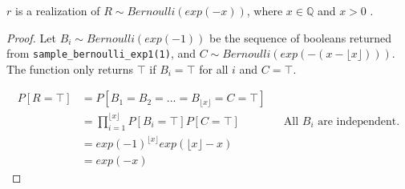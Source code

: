 \documentclass{article}
\begin{document}
\begin{theorem}
$r$ is a realization of $R \sim Bernoulli(exp(-x))$, where $x \in \mathbb{Q}$ and $x > 0$ \cite{CKS20}.
\end{theorem}

\begin{proof}
Let $B_i \sim Bernoulli(exp(-1))$ be the sequence of booleans returned from \texttt{sample\_bernoulli\_exp1(1)}, and $C \sim Bernoulli(exp(-(x - \lfloor x \rfloor)))$.
The function only returns $\top$ if $B_i = \top$ for all $i$ and $C = \top$.

\begin{align*}
    P[R = \top] &= P[B_1 = B_2 = ... = B_{\lfloor x \rfloor} = C = \top] \\
    &= \prod_{i=1}^{\lfloor x \rfloor} P[B_i = \top] P[C = \top] && \text{All $B_i$ are independent.} \\
    &= exp(-1)^{\lfloor x \rfloor} exp(\lfloor x \rfloor - x) \\
    &= exp(-x)
\end{align*}
\end{proof}



\end{document}
